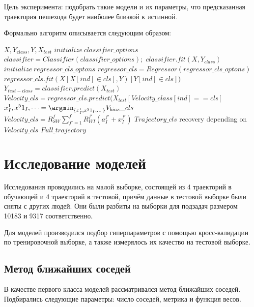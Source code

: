 \documentclass[12pt,twoside]{article}
\begin{document}
Цель эксперимента: подобрать такие модели и их параметры, что предсказанная траектория пешехода будет наиболее близкой к истинной.


Формально алгоритм описывается следующим образом: 

\begin{algorithmic}[1]
    \REQUIRE $X, Y_{class}, Y, X_{test}$
    \STATE $initialize ~ classifier\_options$
    \STATE $classifier = Classifier(classifier\_options);$
    \STATE $classifier.fit(X, Y_{class})$
    \STATE $initialize ~ regressor\_cls\_optons$
    \STATE $regressor\_cls = Regressor(regressor\_cls\_optons)$
    \STATE $regressor\_cls.fit(X[X[ind] \in cls], Y)[Y[ind] \in cls])$
    \ENDFOR
    \STATE $Y_{test-class} = classifier.predict(X_{test})$
    \STATE $Velocity\_cls = regressor\_cls.predict(X_{test}
    [Velocity\_class[ind] == cls]$
    \STATE $x^1_I, x^51_I,\dots = \argmin_{\{x^1_I, x^51_I,\dots\}}V_{bias}\_cls$
    \STATE $Velocity\_cls = R_{SW}^f\sum_{f'=1}^f R_{WI}^{f'}(a_I^{f'}+x_I^{f'})$
    \STATE $Trajectory\_cls$ recovery depending on $Velocity\_cls$
    \ENDFOR
    \RETURN $Full\_trajectory$
\end{algorithmic}

\section{Исследование моделей}

Исследования проводились на малой выборке, состоящей из 4 траекторий в обучающей и 4 траекторий в тестовой, причём данные в тестовой выборке были сняты с других людей. Они были разбиты 
на выборки для подзадач размером 10183 и 9317 соответственно.

Для моделей производился подбор гиперпараметров с помощью кросс-валидации по тренировочной выборке, а также измерялось их качество на тестовой выборке.

\subsection{Метод ближайших соседей}
В качестве первого класса моделей рассматривался метод ближайших соседей. Подбирались следующие параметры: число соседей, метрика и функция весов.
\end{document}
